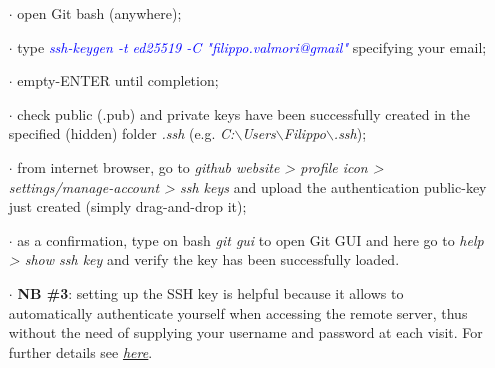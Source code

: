 \documentclass[a4paper,portrait,10pt]{article}   %
\newcommand{\mycmd}[1]{\textcolor{blue}{\textit{#1}}}   %
\begin{document}
\begin{itemize}
  \item[$\cdot$] open Git bash (anywhere);
  \item[$\cdot$] type \mycmd{ssh-keygen -t ed25519 -C "filippo.valmori@gmail"} specifying your email;
  \item[$\cdot$] empty-ENTER until completion;
  \item[$\cdot$] check public (.pub) and private keys have been successfully created in the specified (hidden) folder \textit{.ssh} (e.g. \textit{C:$\backslash$Users$\backslash$Filippo$\backslash$.ssh});
  \item[$\cdot$] from internet browser, go to \textit{github website > profile icon > settings/manage-account > ssh keys} and upload the authentication public-key just created (simply drag-and-drop it);
  \item[$\cdot$] as a confirmation, type on bash \textit{git gui} to open Git GUI and here go to \textit{help > show ssh key} and verify the key has been successfully loaded.
  \item[$\cdot$] \textbf{NB \#3}: setting up the SSH key is helpful because it allows to automatically authenticate yourself when accessing the remote server, thus without the need of supplying your username and password at each visit. For further details see 
\href{https://confluence.atlassian.com/bitbucketserverkb/ssh-rsa-key-rejected-with-message-no-mutual-signature-algorithm-1026057701.html}{\underline{\textit{here}}}.
\end{itemize}

\end{document}
